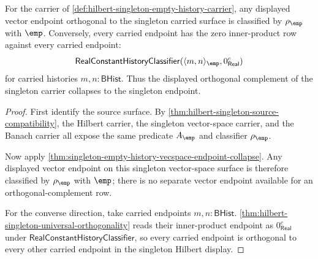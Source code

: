 \begin{theorem}
\label{thm:hilbert-singleton-orthogonal-complement-collapse}
For the carrier of
\autoref{def:hilbert-singleton-empty-history-carrier}, any displayed vector
endpoint orthogonal to the singleton carried surface is classified by
$\rho_{\emp}$ with $\emp$. Conversely, every carried endpoint has the
zero inner-product row against every carried endpoint:
$$
\mathsf{RealConstantHistoryClassifier}
  (\langle m,n\rangle_{\emp},0_{\mathsf{Real}}^{c})
$$
for carried histories $m,n:\mathsf{BHist}$. Thus the displayed orthogonal
complement of the singleton carrier collapses to the singleton endpoint.
\end{theorem}
\begin{proof}
First identify the source surface. By
\autoref{thm:hilbert-singleton-source-compatibility}, the Hilbert carrier,
the singleton vector-space carrier, and the Banach carrier all expose the
same predicate $A_{\emp}$ and classifier $\rho_{\emp}$.

Now apply
\autoref{thm:singleton-empty-history-vecspace-endpoint-collapse}. Any
displayed vector endpoint on this singleton vector-space surface is therefore
classified by $\rho_{\emp}$ with $\emp$; there is no separate vector endpoint
available for an orthogonal-complement row.

For the converse direction, take carried endpoints $m,n:\mathsf{BHist}$.
\autoref{thm:hilbert-singleton-universal-orthogonality} reads their
inner-product endpoint as $0_{\mathsf{Real}}^{c}$ under
$\mathsf{RealConstantHistoryClassifier}$, so every carried endpoint is
orthogonal to every other carried endpoint in the singleton Hilbert display.
\end{proof}

